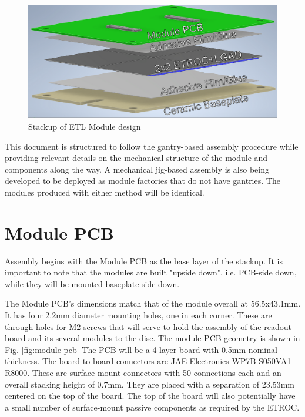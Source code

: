 \documentclass[10pt]{datasheet}
\begin{document}
\begin{figure}[h]
	\centering
	\includegraphics[width=\textwidth]{figures/overview.png}
	\caption{Stackup of ETL Module design}
	\label{fig:overview}
\end{figure}

This document is structured to follow the gantry-based assembly procedure while providing relevant details on the mechanical structure of the module and components along the way. A mechanical jig-based assembly is also being developed to be deployed as module factories that do not have gantries. The modules produced with either method will be identical.


\section{Module PCB}

Assembly begins with the Module PCB as the base layer of the stackup. It is important to note that the modules are built "upside down", i.e. PCB-side down, while they will be mounted baseplate-side down.

The Module PCB's dimensions match that of the module overall at 56.5x43.1mm. It has four 2.2mm diameter mounting holes, one in each corner. These are through holes for M2 screws that will serve to hold the assembly of the readout board and its several modules to the disc. The module PCB geometry is shown in Fig. \ref{fig:module-pcb} The PCB will be a 4-layer board with 0.5mm nominal thickness. The board-to-board connectors are JAE Electronics WP7B-S050VA1-R8000. These are surface-mount connectors with 50 connections each and an overall stacking height of 0.7mm. They are placed with a separation of 23.53mm centered on the top of the board. The top of the board will also potentially have a small number of surface-mount passive components as required by the ETROC.
\end{document}
